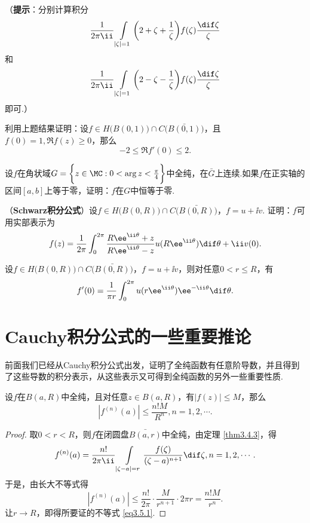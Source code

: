 \begin{xiti}
（\textbf{提示}：分别计算积分
\[\frac1{2\pi\ii}\int\limits_{|\zeta|=1}\bigg(2+\zeta+\frac1\zeta\bigg)f(\zeta)
\frac{\dif \zeta}\zeta\]
和
\[\frac1{2\pi\ii}\int\limits_{|\zeta|=1}\bigg(2-\zeta-\frac1\zeta\bigg)f(\zeta)
\frac{\dif \zeta}\zeta\]
即可.）
\item 利用上题结果证明：设$f\in H\big(B(0,1)\big)\cap C\big(\bar{B(0,1)}\big)$，且$f(0)=1,\Re f(z)\ge0$，那么
\[-2\le\Re f'(0)\le 2.\]
\item 设$f$在角状域$G=\bigg\{z\in\MC:0<\arg z<\frac\pi4\bigg\}$中全纯，在$\bar G$上连续.如果$f$在正实轴的区间$[a,b]$上等于零，证明：$f$在$G$中恒等于零.
\item （\textbf{Schwarz积分公式}）设$f\in H\big(B(0,R)\big)\cap C\big(\bar{B(0,R)}\big)$，$f=u+\ii v$. 证明：$f$可用实部表示为
    \[f(z)=\frac1{2\pi}\int_0^{2\pi}\frac{R\ee^{\ii\theta}+z}{R\ee^{\ii\theta}-z}
    u(R\ee^{\ii\theta})\dif \theta+\ii v(0).\]
\item 设$f\in H\big(B(0,R)\big)\cap C\big(\bar{B(0,R)}\big)$，$f=u+\ii v$，则对任意$0<r\le R$，有
    \[f'(0)=\frac1{\pi r}\int_0^{2\pi}u(r\ee^{\ii\theta})\ee^{-\ii\theta}\dif \theta.\]
\end{xiti}

\section{Cauchy积分公式的一些重要推论\label{sec3.5}}
前面我们已经从Cauchy积分公式出发，证明了全纯函数有任意阶导数，并且得到了这些导数的积分表示，从这些表示又可得到全纯函数的另外一些重要性质.
\begin{theorem}\label{thm3.5.1}
设$f$在$B(a,R)$中全纯，且对任意$z\in B(a,R)$，有$|f(z)|\le M$，那么
\begin{equation}\label{eq3.5.1}
|f^{(n)}(a)|\le\frac{n!M}{R^n},n=1,2,\cdots.
\end{equation}
\begin{proof}
取$0<r<R$，则$f$在闭圆盘$\bar{B(a,r)}$中全纯，由定理 \ref{thm3.4.3}，得
\begin{equation*}
  f^{(n)}(a)=\frac{n!}{2\pi\ii}\int\limits_{|\zeta-a|=r}\frac{f(\zeta)}{(\zeta-a)^{n+1}}\dif \zeta,n=1,2,\cdots.
\end{equation*}
于是，由长大不等式得
\[|f^{(n)}(a)|\le\frac{n!}{2\pi}\cdot\frac M{r^{n+1}}\cdot2\pi r=\frac{n!M}{r^n}.\]
让$r\to R$，即得所要证的不等式 \eqref{eq3.5.1}.
\end{proof}
\end{theorem}


